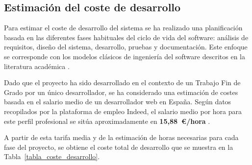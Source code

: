 \subsection{Estimación del coste de desarrollo}

Para estimar el coste de desarrollo del sistema se ha realizado una planificación basada en las diferentes fases habituales del ciclo de vida del software: análisis de requisitos, diseño del sistema, desarrollo, pruebas y documentación. Este enfoque se corresponde con los modelos clásicos de ingeniería del software descritos en la literatura académica \cite[Chap.~2, pp.~27--37]{sommerville}.

Dado que el proyecto ha sido desarrollado en el contexto de un Trabajo Fin de Grado por un único desarrollador, se ha considerado una estimación de costes basada en el salario medio de un desarrollador web en España. Según datos recopilados por la plataforma de empleo Indeed, el salario medio por hora para este perfil profesional se sitúa aproximadamente en \textbf{15,88~\euro/hora} \cite{indeed2024salarios}.

A partir de esta tarifa media y de la estimación de horas necesarias para cada fase del proyecto, se obtiene el coste total de desarrollo que se muestra en la Tabla~\ref{tabla_coste_desarrollo}.


